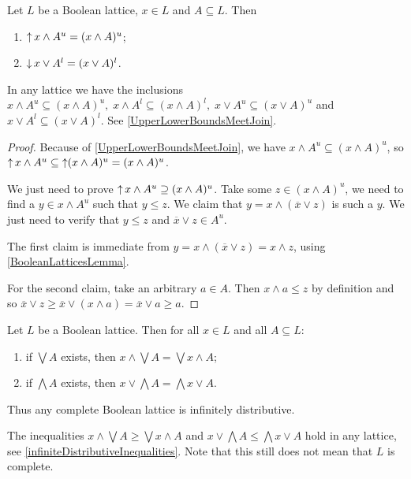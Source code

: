 \begin{lemma}
Let $L$ be a Boolean lattice, $x\in L$ and $A\subseteq L$. Then
\begin{enumerate}
\item $\operatorname{\uparrow} x\wedge A^u = (x\wedge A)^u$;
\item $\operatorname{\downarrow} x\vee A^l = (x\vee A)^l$.
\end{enumerate}
\end{lemma}
In any lattice we have the inclusions $x\wedge A^u \subseteq (x\wedge A)^u, \;x\wedge A^l \subseteq (x\wedge A)^l, \;x\vee A^u \subseteq (x\vee A)^u$ and $x\vee A^l \subseteq (x\vee A)^l$. See \ref{UpperLowerBoundsMeetJoin}.
\begin{proof}
Because of \ref{UpperLowerBoundsMeetJoin}, we have $x\wedge A^u \subseteq (x\wedge A)^u$, so $\operatorname{\uparrow} x\wedge A^u \subseteq \operatorname{\uparrow}(x\wedge A)^u = (x\wedge A)^u$.

We just need to prove $\operatorname{\uparrow} x\wedge A^u \supseteq (x\wedge A)^u$. Take some $z\in (x\wedge A)^u$, we need to find a $y\in x\wedge A^u$ such that $y \leq z$. We claim that $y = x\wedge (\overline{x}\vee z)$ is such a $y$. We just need to verify that $y \leq z$ and $\overline{x}\vee z \in A^u$.

The first claim is immediate from $y = x\wedge (\overline{x}\vee z) = x\wedge z$, using \ref{BooleanLatticesLemma}.

For the second claim, take an arbitrary $a\in A$. Then $x\wedge a \leq z$ by definition and so $\overline{x}\vee z \geq \overline{x}\vee (x\wedge a) = \overline{x}\vee a \geq a$.
\end{proof}
\begin{corollary} \label{infiniteDistributiveLawsBooleanLattices}
Let $L$ be a Boolean lattice. Then for all $x\in L$ and all $A\subseteq L$:
\begin{enumerate}
\item if $\bigvee A$ exists, then $x\wedge \bigvee A = \bigvee x\wedge A$;
\item if $\bigwedge A$ exists, then $x\vee \bigwedge A = \bigwedge x\vee A$.
\end{enumerate}
Thus any complete Boolean lattice is infinitely distributive.
\end{corollary}
The inequalities $x\wedge \bigvee A \geq \bigvee x\wedge A$ and $x\vee \bigwedge A \leq \bigwedge x\vee A$ hold in any lattice, see \ref{infiniteDistributiveInequalities}. Note that this still does not mean that $L$ is complete.
